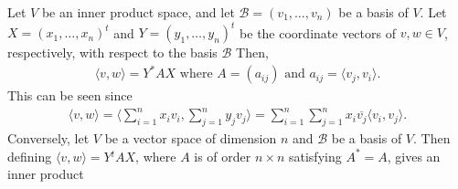 \documentclass[15pt,a4paper]{book}
\theoremstyle{definition}
\newcommand{\mc}[1]{\mathcal{#1}}
\newcommand{\ip}[1]{\langle #1 \rangle}
\newcommand{\conj}[1]{\overline{#1}}
\begin{document}
Let $V$ be an inner product space, and let $\mc{B} = (v_{1},\ldots,v_{n})$ be a basis of $V$. Let $X = (x_{1},\ldots,x_{n})^{t}$ and $Y = (y_{1},\ldots,y_{n})^{t}$ be the coordinate vectors of $v,w \in V$, respectively, with respect to the basis $\mc{B}$ Then,
\begin{align}
    \ip{v,w} = Y^{\ast}AX \text{ where } A = (a_{ij}) \text{ and } a_{ij} = \ip{v_{j},v_{i}}.
\end{align}
This can be seen since
\begin{align}
    \ip{v,w} = \ip{\sum_{i=1}^{n} x_{i}v_{i}, \sum_{j=1}^{n} y_{j}v_{j}} = \sum_{i=1}^{n} \sum_{j=1}^{n} x_{i} \conj{v_{j}} \ip{v_{i},v_{j}}.
\end{align}
Conversely, let $V$ be a vector space of dimension $n$ and $\mc{B}$ be a basis of $V$. Then defining $\ip{v,w} = Y{^t}AX$, where $A$ is of order $n \times n$ satisfying $A^{\ast} = A$, gives an inner product

\end{document}
